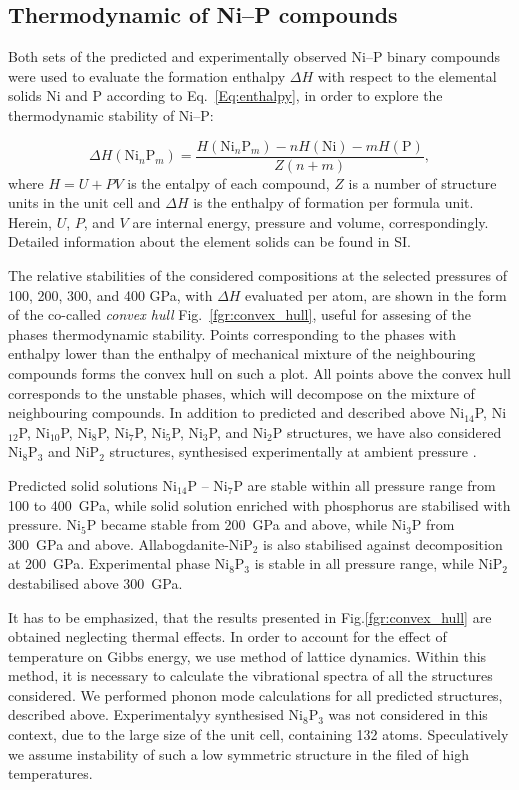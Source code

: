 \documentclass[twoside,twocolumn,9pt]{article}
\begin{document}
\subsection{Thermodynamic of Ni--P compounds}

Both sets of the predicted and experimentally observed Ni--P binary compounds were used to evaluate the formation enthalpy $\Delta H$ with respect to the elemental solids Ni and P according to Eq.~\ref{Eq:enthalpy}, in order to explore the thermodynamic stability of Ni--P:  

\begin{equation}\label{Eq:enthalpy}
 \Delta H(\mathrm{Ni}_n\mathrm{P}_m) = \frac{H(\mathrm{Ni}_n\mathrm{P}_m)-nH(\mathrm{Ni})-mH(\mathrm{P})}{Z(n+m)},
\end{equation} 
where $H=U+PV$ is the entalpy of each compound, $Z$ is a number of structure units in the unit cell and $\Delta H$ is the enthalpy of formation per formula unit. 
Herein, $U$, $P$, and $V$ are internal energy, pressure and volume, correspondingly. 
Detailed information about the element solids can be found in SI. 

The relative stabilities of the considered compositions at the selected pressures of 100, 200, 300, and 400 GPa, with $\Delta H$ evaluated per atom, are shown in the form of the co-called {\it convex hull} Fig.~\ref{fgr:convex_hull}, useful for assesing of the phases thermodynamic stability. 
Points corresponding to the phases with enthalpy lower than the enthalpy of mechanical mixture of the neighbouring compounds forms the convex hull on such a plot.
All points above the convex hull corresponds to the unstable phases, which will decompose on the mixture of neighbouring compounds.
In addition to predicted and described above Ni$_{14}$P, Ni$_{12}$P, Ni$_{10}$P, Ni$_8$P, Ni$_7$P, Ni$_5$P, Ni$_3$P, and Ni$_2$P structures, we have also considered Ni$_8$P$_3$ and NiP$_2$ structures, synthesised experimentally at ambient pressure \cite{}.

Predicted solid solutions Ni$_{14}$P -- Ni$_7$P are stable within all pressure range from 100 to 400~GPa, while solid solution enriched with phosphorus are stabilised with pressure.
Ni$_5$P became stable from  200~GPa and above, while Ni$_3$P from 300~GPa and above. Allabogdanite-NiP$_2$ is also stabilised against decomposition at 200~GPa.
Experimental phase Ni$_8$P$_3$ is stable in all pressure range, while NiP$_2$ destabilised above 300~GPa.

It has to be emphasized, that the results presented in Fig.\ref{fgr:convex_hull} are obtained neglecting thermal effects. 
In order to account for the effect of temperature on Gibbs energy, we use method of lattice dynamics.
Within this method, it is necessary to calculate the vibrational spectra of all the structures considered. 
We performed phonon mode calculations for all predicted structures, described above. 
Experimentalyy synthesised Ni$_8$P$_3$ was not considered in this context, due to the large size of the unit cell, containing 132 atoms.
Speculatively we assume instability of such a low symmetric structure in the filed of high temperatures.
\end{document}
